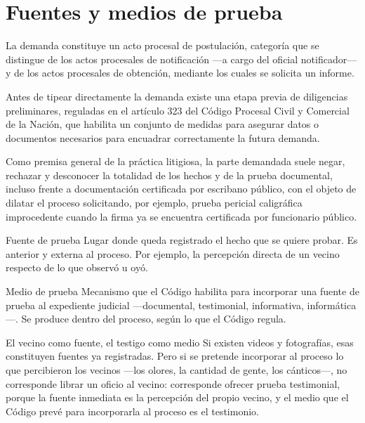 \documentclass[12pt,oneside]{book}
\begin{document}
\section{Fuentes y medios de prueba}

La demanda constituye un acto procesal de postulación, categoría que se distingue de los actos procesales de notificación —a cargo del oficial notificador— y de los actos procesales de obtención, mediante los cuales se solicita un informe.

Antes de tipear directamente la demanda existe una etapa previa de diligencias preliminares, reguladas en el artículo 323 del Código Procesal Civil y Comercial de la Nación, que habilita un conjunto de medidas para asegurar datos o documentos necesarios para encuadrar correctamente la futura demanda.

Como premisa general de la práctica litigiosa, la parte demandada suele negar, rechazar y desconocer la totalidad de los hechos y de la prueba documental, incluso frente a documentación certificada por escribano público, con el objeto de dilatar el proceso solicitando, por ejemplo, prueba pericial caligráfica improcedente cuando la firma ya se encuentra certificada por funcionario público.

\begin{definition}{Fuente de prueba}
Lugar donde queda registrado el hecho que se quiere probar. Es anterior y externa al proceso. Por ejemplo, la percepción directa de un vecino respecto de lo que observó u oyó.
\end{definition}

\begin{definition}{Medio de prueba}
Mecanismo que el Código habilita para incorporar una fuente de prueba al expediente judicial —documental, testimonial, informativa, informática—. Se produce dentro del proceso, según lo que el Código regula.
\end{definition}

\begin{example}{El vecino como fuente, el testigo como medio}
Si existen videos y fotografías, esas constituyen fuentes ya registradas. Pero si se pretende incorporar al proceso lo que percibieron los vecinos —los olores, la cantidad de gente, los cánticos—, no corresponde librar un oficio al vecino: corresponde ofrecer prueba testimonial, porque la fuente inmediata es la percepción del propio vecino, y el medio que el Código prevé para incorporarla al proceso es el testimonio.
\end{example}
\end{document}
